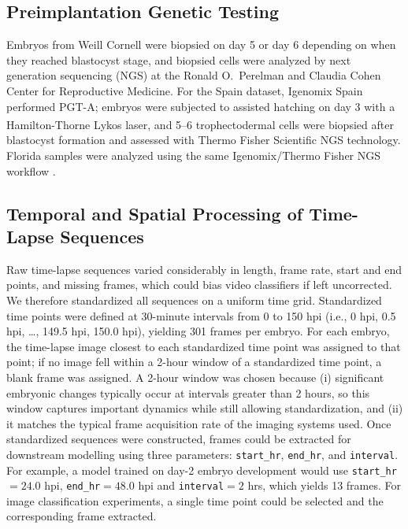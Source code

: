\documentclass[11pt,a4paper]{article}
\begin{document}
\subsection{Preimplantation Genetic Testing}

Embryos from Weill Cornell were biopsied on day 5 or day 6 depending on
when they reached blastocyst stage, and biopsied cells were analyzed by
next generation sequencing (NGS) at the Ronald O.\ Perelman and Claudia
Cohen Center for Reproductive Medicine. For the Spain dataset, Igenomix
Spain performed PGT-A; embryos were subjected to assisted hatching on
day 3 with a Hamilton-Thorne Lykos\textsuperscript{\textregistered} laser,
and 5--6 trophectodermal cells were biopsied after blastocyst formation
and assessed with Thermo Fisher Scientific NGS technology. Florida samples
were analyzed using the same Igenomix/Thermo Fisher NGS workflow
\cite{garcia2020optimized}.

\subsection{Temporal and Spatial Processing of Time-Lapse Sequences}

Raw time-lapse sequences varied considerably in length, frame rate, start
and end points, and missing frames, which could bias video classifiers if
left uncorrected. We therefore standardized all sequences on a uniform
time grid. Standardized time points were defined at 30-minute intervals
from 0 to 150 hpi (i.e., 0 hpi, 0.5 hpi, \ldots, 149.5 hpi, 150.0 hpi),
yielding 301 frames per embryo. For each embryo, the time-lapse image
closest to each standardized time point was assigned to that point; if no
image fell within a 2-hour window of a standardized time point, a blank
frame was assigned. A 2-hour window was chosen because (i) significant
embryonic changes typically occur at intervals greater than 2 hours, so
this window captures important dynamics while still allowing
standardization, and (ii) it matches the typical frame acquisition rate of
the imaging systems used. Once standardized sequences were constructed,
frames could be extracted for downstream modelling using three parameters:
\texttt{start\_hr}, \texttt{end\_hr}, and \texttt{interval}. For example,
a model trained on day-2 embryo development would use
\texttt{start\_hr}$=24.0$ hpi, \texttt{end\_hr}$=48.0$ hpi and
\texttt{interval}$=2$ hrs, which yields 13 frames. For image
classification experiments, a single time point could be selected and the
corresponding frame extracted.
\end{document}
